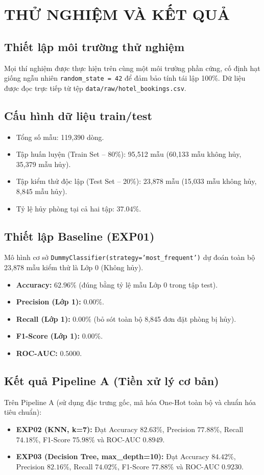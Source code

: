 \chapter{THỬ NGHIỆM VÀ KẾT QUẢ}

\section{Thiết lập môi trường thử nghiệm}
Mọi thí nghiệm được thực hiện trên cùng một môi trường phần cứng, cố định hạt giống ngẫu nhiên \texttt{random\_state = 42} để đảm bảo tính tái lập 100\%. Dữ liệu được đọc trực tiếp từ tệp \texttt{data/raw/hotel\_bookings.csv}.

\section{Cấu hình dữ liệu train/test}
\begin{itemize}
    \item Tổng số mẫu: 119,390 dòng.
    \item Tập huấn luyện (Train Set -- 80\%): 95,512 mẫu (60,133 mẫu không hủy, 35,379 mẫu hủy).
    \item Tập kiểm thử độc lập (Test Set -- 20\%): 23,878 mẫu (15,033 mẫu không hủy, 8,845 mẫu hủy).
    \item Tỷ lệ hủy phòng tại cả hai tập: $37.04\%$.
\end{itemize}

\section{Thiết lập Baseline (EXP01)}
Mô hình cơ sở \texttt{DummyClassifier(strategy='most\_frequent')} dự đoán toàn bộ 23,878 mẫu kiểm thử là Lớp 0 (Không hủy).
\begin{itemize}
    \item \textbf{Accuracy:} $62.96\%$ (đúng bằng tỷ lệ mẫu Lớp 0 trong tập test).
    \item \textbf{Precision (Lớp 1):} $0.00\%$.
    \item \textbf{Recall (Lớp 1):} $0.00\%$ (bỏ sót toàn bộ 8,845 đơn đặt phòng bị hủy).
    \item \textbf{F1-Score (Lớp 1):} $0.00\%$.
    \item \textbf{ROC-AUC:} $0.5000$.
\end{itemize}

\section{Kết quả Pipeline A (Tiền xử lý cơ bản)}
Trên Pipeline A (sử dụng đặc trưng gốc, mã hóa One-Hot toàn bộ và chuẩn hóa tiêu chuẩn):
\begin{itemize}
    \item \textbf{EXP02 (KNN, k=7):} Đạt Accuracy $82.63\%$, Precision $77.88\%$, Recall $74.18\%$, F1-Score $75.98\%$ và ROC-AUC $0.8949$.
    \item \textbf{EXP03 (Decision Tree, max\_depth=10):} Đạt Accuracy $84.42\%$, Precision $82.16\%$, Recall $74.02\%$, F1-Score $77.88\%$ và ROC-AUC $0.9230$.
\end{itemize}

